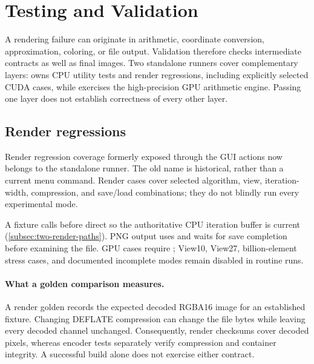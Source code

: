 \section{Testing and Validation}
\label{sec:testing}

A rendering failure can originate in arithmetic, coordinate conversion,
approximation, coloring, or file output. Validation therefore checks intermediate
contracts as well as final images. Two standalone runners cover complementary
layers:  owns CPU utility tests and render regressions,
including explicitly selected CUDA cases, while  exercises
the high-precision GPU arithmetic engine. Passing one layer does not establish
correctness of every other layer.

\subsection{Render regressions}
\label{subsec:crummytest}

Render regression coverage formerly exposed through the  GUI
actions now belongs to the standalone  runner. The old name
is historical, rather than a current menu command. Render cases cover selected
algorithm, view, iteration-width, compression, and save/load combinations;
they do not blindly run every experimental mode.

A fixture calls  before direct  so the
authoritative CPU iteration buffer is current
(\cref{subsec:two-render-paths}). PNG output uses  and
waits for save completion before examining the file. GPU cases require
; View10, View27, billion-element stress cases, and documented
incomplete modes remain disabled in routine runs.

\paragraph{What a golden comparison measures.}
A render golden records the expected decoded RGBA16 image for an established
fixture. Changing DEFLATE compression can change the file bytes while leaving
every decoded channel unchanged. Consequently, render checksums cover decoded
pixels, whereas encoder tests separately verify compression and container
integrity. A successful build alone does not exercise either contract.

